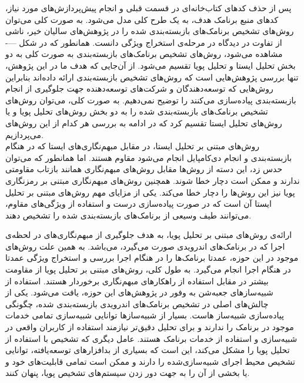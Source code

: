 پس از حذف کد‌های کتاب‌خانه‌ای در قسمت قبلی و انجام پیش‌پردازش‌های مورد نیاز، کد‌های منبع برنامک هدف، به یک طرح کلی مدل می‌شود. به صورت کلی می‌توان روش‌های تشخیص برنامک‌های بازبسته‌بندی شده را در پژوهش‌های سالیان خیر، ناشی از تفاوت در دیدگاه در مرحله‌ی استخراج ویژگی دانست. همانطور که در شکل ---- مشاهده می‌شود، روش‌های تشخیص برنامک‌های بازبسته‌بندی به صورت کلی به دو بخش تحلیل ایستا و تحلیل پویا تقسیم می‌شود. از آن‌جایی که هدف ما در این پژوهش، تنها بررسی پژوهش‌هایی است که روش‌های تشخیص بازبسته‌بندی ارائه داده‌اند بنابراین روش‌هایی که توسعه‌دهندگان و شرکت‌های توسعه‌دهنده جهت جلوگیری از انجام بازبسته‌بندی پیاده‌سازی می‌کنند را توضیح نمی‌دهیم. به صورت کلی، می‌توان روش‌های تشخیص برنامک‌های بازبسته‌بندی شده را به دو بخش روش‌های تحلیل پویا و یا روش‌های تحلیل ایستا تقسیم کرد که در ادامه به بررسی هر کدام از این روش‌های می‌پردازیم. \\
 روش‌های مبتنی بر تحلیل ایستا، در مقابل مبهم‌نگاری‌‌های ایستا که در هنگام بازبسته‌بندی و انجام دی‌کامپایل انجام می‌شود مقاوم هستند. اما همانطور که می‌توان حدس زد، این دسته از روش‌ها مقابل روش‌های مبهم‌نگاری همانند بازتاب مقاومتی ندارند و ممکن است دچار خطا شوند. همچنین روش‌های مبهم‌نگاری مبتنی بر رمز‌نگاری پویا نیز این روش‌‌ها را دچار خطا می‌کند. یکی از مزایای مهم روش‌های مبتنی بر تحلیل ایستا آن است که در صورت پیاده‌سازی درست و استفاده از ویژگی‌های مقاوم، می‌توانند طیف وسیعی از برنامک‌های بازبسته‌بندی شده را تشخیص دهند.

 ارائه‌ی روش‌های مبتنی بر تحلیل پویا، به هدف جلوگیری از مبهم‌نگاری‌های در لحظه‌ی اجرا که در برنامک‌های اندرویدی صورت می‌گیرد، می‌باشد. به همین علت روش‌های موجود در این حوزه، عمدتا برنامک‌ها را در هنگام اجرا بررسی و  استخراج ویژگی عمدتا در هنگام اجرا انجام می‌گیرد. به طول کلی، روش‌های مبتنی بر تحلیل پویا از مقاومت بیشتر در مقابل استفاده از راهکار‌های مبهم‌نگاری برخوردار هستند. استفاده از شبیه‌ساز‌های جعبه‌شن به وفور در پژوهش‌های این حوزه، یافت می‌شود. یکی از چالش‌های اصلی در تشخیص برنامک‌های اندرویدی بازبسته‌بندی شده، چگونگی پیاده‌سازی شبیه‌ساز‌ هاست. بسیار از شبیه‌سازها توانایی شبیه‌سازی تمامی خدمات موجود در برنامک‌ را ندارند و برای تحلیل دقیق‌تر نیازمند استفاده از کاربران واقعی در شبیه‌سازی و استفاده از خدمات برنامک هستند. عامل دیگری که تشخیص با استفاده از تحلیل پویا را مشکل می‌کند، این است که بسیاری از بدافزار‌های توسعه‌یافته، توانایی تشخیص محیط اجرای شبیه‌سازی‌شده را دارند و ممکن است تمامی قابلیت‌های خود و یا بخشی از آن‌ را به جهت دور زدن سیستم‌های تشخیص پویا، پنهان کنند.

